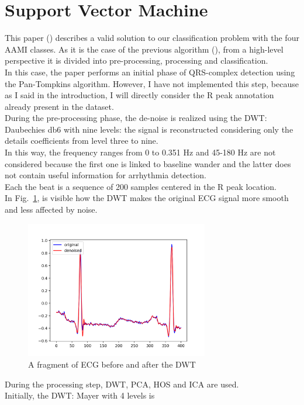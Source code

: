 \documentclass[LaM,binding=0.6cm]{sapthesis}
\begin{document}
\section{Support Vector Machine \cite{svmnl}}
This paper (\cite{svmnl}) describes a valid solution to our classification problem with the four AAMI classes. As it is the case of the previous algorithm (\cite{forest}), from a high-level perspective it is divided into pre-processing, processing and classification.\\In this case, the paper performs an initial phase of QRS-complex detection using the Pan-Tompkins algorithm. However, I have not implemented this step, because as I said in the introduction, I will directly consider the R peak annotation already present in the dataset.\\During the pre-processing phase, the de-noise is realized using the DWT: Daubechies db6 with nine levels: the signal is reconstructed considering only the details coefficients from level three to nine.\\In this way, the frequency ranges from 0 to 0.351 Hz and 45-180 Hz are not considered because the first one is linked to baseline wander and the latter does not contain useful information for arrhythmia detection.\\Each the beat is a sequence of 200 samples centered in the R peak location.\\In Fig.~\ref{fig:svc1}, is visible how the DWT makes the original ECG signal more smooth and less affected by noise.
\begin{figure}[H]  \centering
    \includegraphics[width=80mm,scale=0.7]{svm-before-after}
    \caption{A fragment of ECG before and after the DWT}
    \label{fig:svc1}
\end{figure}
During the processing step, DWT, PCA, HOS and ICA are used.\\Initially, the DWT: Mayer with 4 levels is 
\end{document}
